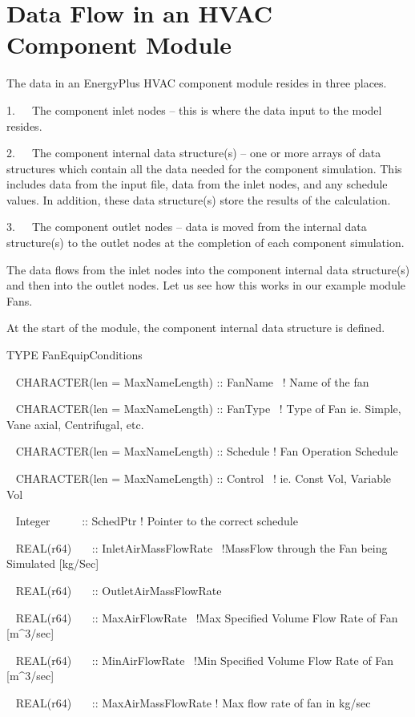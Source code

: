 \section{Data Flow in an HVAC Component Module}\label{data-flow-in-an-hvac-component-module}

The data in an EnergyPlus HVAC component module resides in three places.

1.~~~The component inlet nodes -- this is where the data input to the model resides.

2.~~~The component internal data structure(s) -- one or more arrays of data structures which contain all the data needed for the component simulation. This includes data from the input file, data from the inlet nodes, and any schedule values. In addition, these data structure(s) store the results of the calculation.

3.~~~The component outlet nodes -- data is moved from the internal data structure(s) to the outlet nodes at the completion of each component simulation.

The data flows from the inlet nodes into the component internal data structure(s) and then into the outlet nodes. Let us see how this works in our example module Fans.

At the start of the module, the component internal data structure is defined.

TYPE FanEquipConditions

~ CHARACTER(len = MaxNameLength) :: FanName~ ! Name of the fan

~ CHARACTER(len = MaxNameLength) :: FanType~ ! Type of Fan ie. Simple, Vane axial, Centrifugal, etc.

~ CHARACTER(len = MaxNameLength) :: Schedule ! Fan Operation Schedule

~ CHARACTER(len = MaxNameLength) :: Control~ ! ie. Const Vol, Variable Vol

~ Integer~~~~~ :: SchedPtr ! Pointer to the correct schedule

~ REAL(r64)~~~ :: InletAirMassFlowRate~ !MassFlow through the Fan being Simulated {[}kg/Sec{]}

~ REAL(r64)~~~ :: OutletAirMassFlowRate

~ REAL(r64)~~~ :: MaxAirFlowRate~ !Max Specified Volume Flow Rate of Fan {[}m\^{}3/sec{]}

~ REAL(r64)~~~ :: MinAirFlowRate~ !Min Specified Volume Flow Rate of Fan {[}m\^{}3/sec{]}

~ REAL(r64)~~~ :: MaxAirMassFlowRate ! Max flow rate of fan in kg/sec

